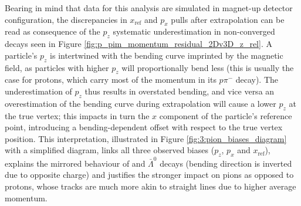 Bearing in mind that data for this analysis are simulated in magnet-up detector configuration, the discrepancies in $x_\text{ref}$ and $p_x$ pulls after extrapolation can be read as consequence of the $p_z$ systematic underestimation in non-converged decays seen in Figure \ref{fig:p_pim_momentum_residual_2Dv3D_z_rel}.
A particle's $p_z$ is intertwined with the bending curve imprinted by the magnetic field, as particles with higher $p_z$ will proportionally bend less (this is usually the case for protons, which carry most of the \lz momentum in its $p\pi^-$ decay).
The underestimation of $p_z$ thus results in overstated bending, and vice versa an overestimation of the bending curve during extrapolation will cause a lower $p_z$ at the true vertex;
this impacts in turn the $x$ component of the particle's reference point, introducing a bending-dependent offset with respect to the true vertex position.
This interpretation, illustrated in Figure \ref{fig:3:pion_biases_diagram} with a simplified diagram, links all three observed biases ($p_z$, $p_x$ and $x_\text{ref}$), explains the mirrored behaviour of \lz and $\bar{\Lambda}^0$ decays (bending direction is inverted due to opposite charge) and justifies the stronger impact on pions as opposed to protons, whose tracks are much more akin to straight lines due to higher average momentum.




